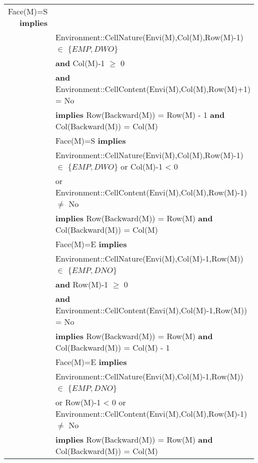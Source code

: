 \begin{tabular}{rl}
Face(M)=S \textbf{implies} \\& \quad Environment::CellNature(Envi(M),Col(M),Row(M)-1) $\in$ $\{EMP, DWO\}$\\& \quad
\textbf{and} Col(M)-1 $\geq$ 0\\& \quad
\textbf{and} Environment::CellContent(Envi(M),Col(M),Row(M)+1) = No
\\& \quad\quad
\textbf{implies} Row(Backward(M)) = Row(M) - 1
\textbf{and} Col(Backward(M)) = Col(M)
\\&
Face(M)=S \textbf{implies} \\& \quad
Environment::CellNature(Envi(M),Col(M),Row(M)-1) $\in$
$\{EMP, DWO\}$ or Col(M)-1 < 0 
\\& \quad
or Environment::CellContent(Envi(M),Col(M),Row(M)-1) $\neq$ No\\& \quad\quad
\textbf{implies} Row(Backward(M)) = Row(M)
\textbf{and} Col(Backward(M)) = Col(M)\\
&
Face(M)=E \textbf{implies} \\& \quad Environment::CellNature(Envi(M),Col(M)-1,Row(M)) $\in$ $\{EMP, DNO\}$\\& \quad
\textbf{and} Row(M)-1 $\geq$ 0\\& \quad
\textbf{and} Environment::CellContent(Envi(M),Col(M)-1,Row(M)) = No\\& \quad\quad
\textbf{implies} Row(Backward(M)) = Row(M)
\textbf{and} Col(Backward(M)) = Col(M) - 1\\
&
Face(M)=E \textbf{implies} \\& \quad
Environment::CellNature(Envi(M),Col(M)-1,Row(M)) $\in$
$\{EMP, DNO\}$ \\& \quad
or Row(M)-1 < 0
or Environment::CellContent(Envi(M),Col(M),Row(M)-1) $\neq$ No
\\& \quad\quad
\textbf{implies} Row(Backward(M)) = Row(M)
\textbf{and} Col(Backward(M)) = Col(M)\\


\end{tabular}
